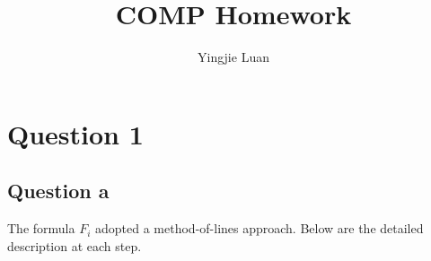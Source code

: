 \documentclass[11pt]{article}
\begin{document}
\title{COMP Homework}
\author{Yingjie Luan}
\maketitle

\tableofcontents


\section{Question 1}
    \subsection{Question a}
    
    The formula $F_i$ adopted a method-of-lines approach. Below are the detailed description at each step.
    
\end{document}
